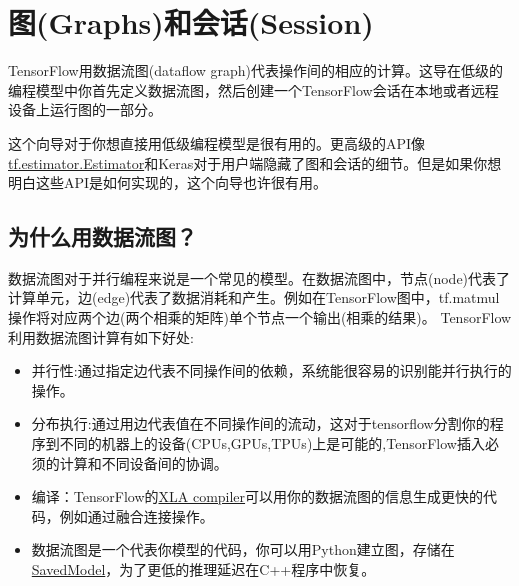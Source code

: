 \section{图(Graphs)和会话(Session)}
TensorFlow用数据流图(dataflow graph)代表操作间的相应的计算。这导在低级的编程模型中你首先定义数据流图，然后创建一个TensorFlow会话在本地或者远程设备上运行图的一部分。

这个向导对于你想直接用低级编程模型是很有用的。更高级的API像\href{https://www.tensorflow.org/api_docs/python/tf/estimator/Estimator?hl=zh-cn}{tf.estimator.Estimator}和Keras对于用户端隐藏了图和会话的细节。但是如果你想明白这些API是如何实现的，这个向导也许很有用。
\subsection{为什么用数据流图？}
数据流图对于并行编程来说是一个常见的模型。在数据流图中，节点(node)代表了计算单元，边(edge)代表了数据消耗和产生。例如在TensorFlow图中，tf.matmul操作将对应两个边(两个相乘的矩阵)单个节点一个输出(相乘的结果)。
TensorFlow利用数据流图计算有如下好处:
\begin{itemize}
\item 并行性:通过指定边代表不同操作间的依赖，系统能很容易的识别能并行执行的操作。
\item 分布执行:通过用边代表值在不同操作间的流动，这对于tensorflow分割你的程序到不同的机器上的设备(CPUs,GPUs,TPUs)上是可能的,TensorFlow插入必须的计算和不同设备间的协调。
\item 编译：TensorFlow的\href{https://www.tensorflow.org/performance/xla/index?hl=zh-cn}{XLA compiler}可以用你的数据流图的信息生成更快的代码，例如通过融合连接操作。
\item 数据流图是一个代表你模型的代码，你可以用Python建立图，存储在\href{https://www.tensorflow.org/programmers_guide/saved_model?hl=zh-cn}{SavedModel}，为了更低的推理延迟在C++程序中恢复。
\end{itemize}
